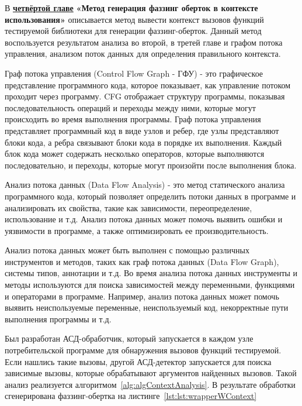 В \underline{\textbf{четвёртой главе}} {\textbf{«Метод генерация фаззинг оберток в контексте использования»}} описывается метод вывести контекст вызовов функций тестируемой библиотеки для генерации фаззинг-оберток. Данный метод воспользуется результатом анализа во второй, в третей главе и графом потока управления, анализом поток данных для определения правильного контекста.

Граф потока управления (Control Flow Graph - ГФУ) - это графическое представление программного кода, которое показывает, как управление потоком проходит через программу. CFG отображает структуру программы, показывая последовательность операций и переходы между ними, которые могут происходить во время выполнения программы. Граф потока управления представляет программный код в виде узлов и ребер, где узлы представляют блоки кода, а ребра связывают блоки кода в порядке их выполнения. Каждый блок кода может содержать несколько операторов, которые выполняются последовательно, и переходы, которые могут произойти после выполнения блока.

Анализ потока данных (Data Flow Analysis) - это метод статического анализа программного кода, который позволяет определить потоки данных в программе и анализировать их свойства, такие как зависимости, переопределение, использование и т.д. Анализ потока данных может помочь выявить ошибки и уязвимости в программе, а также оптимизировать ее производительность.

Анализ потока данных может быть выполнен с помощью различных инструментов и методов, таких как граф потока данных (Data Flow Graph), системы типов, аннотации и т.д. Во время анализа потока данных инструменты и методы используются для поиска зависимостей между переменными, функциями и операторами в программе. Например, анализ потока данных может помочь выявить неиспользуемые переменные, неиспользуемый код, некорректные пути выполнения программы и т.д.

Был разработан АСД-обработчик, который запускается в каждом узле потребительской программе для обнаружения вызовов функций тестируемой. Если нашлись такие вызовы, другой АСД-детектор запускается для поиска зависимые вызовы, которые обрабатывают аргументов найденных вызовов. Такой анализ реализуется алгоритмом~\cref{alg:algContextAnalysis}. В результате обработки сгенерирована фаззинг-обертка на листинге~\cref{lst:lst:wrapperWContext}



